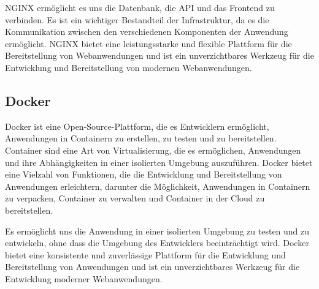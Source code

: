 NGINX ermöglicht es uns die Datenbank, die \acs{API} und das Frontend zu verbinden. Es ist ein wichtiger Bestandteil der Infrastruktur, da es die Kommunikation zwischen den verschiedenen Komponenten der Anwendung ermöglicht. \acs{NGINX} bietet eine leistungsstarke und flexible Plattform für die Bereitstellung von Webanwendungen und ist ein unverzichtbares Werkzeug für die Entwicklung und Bereitstellung von modernen Webanwendungen. \cite{nginx}

\subsection{Docker}


Docker ist eine Open-Source-Plattform, die es Entwicklern ermöglicht, Anwendungen in Containern zu erstellen, zu testen und zu bereitstellen. Container sind eine Art von Virtualisierung, die es ermöglichen, Anwendungen und ihre Abhängigkeiten in einer isolierten Umgebung auszuführen. Docker bietet eine Vielzahl von Funktionen, die die Entwicklung und Bereitstellung von Anwendungen erleichtern, darunter die Möglichkeit, Anwendungen in Containern zu verpacken, Container zu verwalten und Container in der Cloud zu bereitstellen.

Es ermöglicht uns die Anwendung in einer isolierten Umgebung zu testen und zu entwickeln, ohne dass die Umgebung des Entwicklers beeinträchtigt wird. Docker bietet eine konsistente und zuverlässige Plattform für die Entwicklung und Bereitstellung von Anwendungen und ist ein unverzichtbares Werkzeug für die Entwicklung moderner Webanwendungen. \cite{docker}